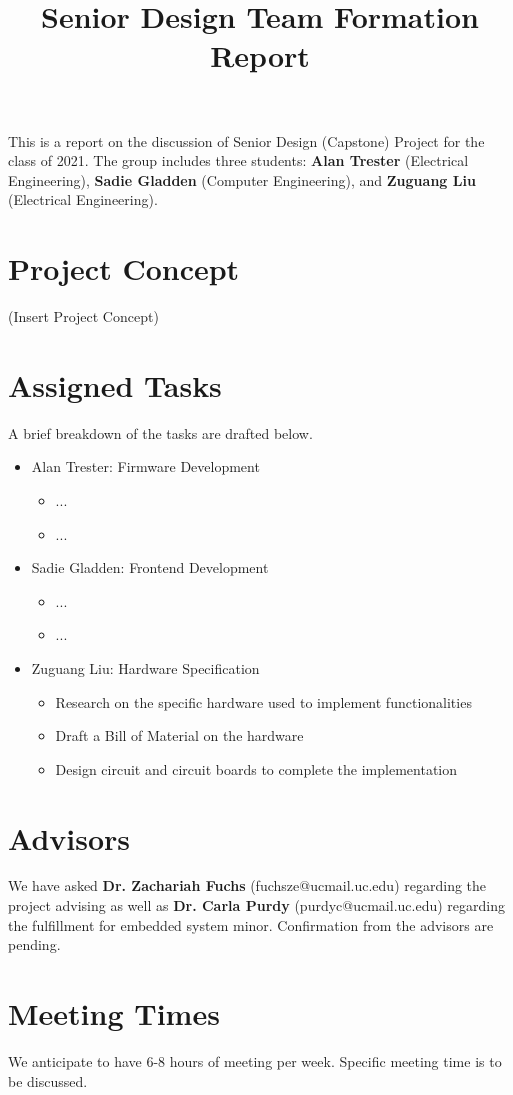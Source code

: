 \documentclass[]{article}
\title{Senior Design Team Formation Report}
\begin{document}
\maketitle

This is a report on the discussion of Senior Design (Capstone) Project for the class of 2021. The group includes three students: \textbf{Alan Trester} (Electrical Engineering), \textbf{Sadie Gladden} (Computer Engineering), and \textbf{Zuguang Liu} (Electrical Engineering).

\section{Project Concept}
(Insert Project Concept)
\section{Assigned Tasks}
A brief breakdown of the tasks are drafted below.
\begin{itemize}

	\item Alan Trester: Firmware Development
	\begin{itemize}
		\item ...
		\item ...
	\end{itemize}

	\item Sadie Gladden: Frontend Development
	\begin{itemize}
		\item ...
		\item ... 
	\end{itemize}

	\item Zuguang Liu: Hardware Specification
	\begin{itemize}
		\item Research on the specific hardware used to implement functionalities
		\item Draft a Bill of Material on the hardware
		\item Design circuit and circuit boards to complete the implementation
	\end{itemize}

\end{itemize}

\section{Advisors}
We have asked \textbf{Dr. Zachariah Fuchs} (fuchsze@ucmail.uc.edu) regarding the project advising as well as \textbf{Dr. Carla Purdy} (purdyc@ucmail.uc.edu) regarding the fulfillment for embedded system minor. Confirmation from the advisors are pending.

\section{Meeting Times}
We anticipate to have 6-8 hours of meeting per week. Specific meeting time is to be discussed. 
\end{document}
